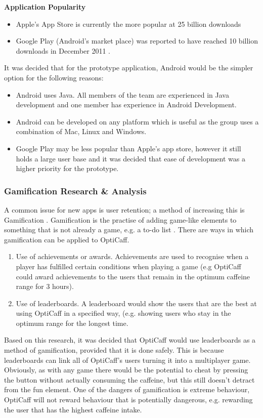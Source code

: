 \textbf{Application Popularity}
\begin{itemize}
	\item{Apple's App Store is currently the more popular at 25 billion downloads \cite{AppleDownload}}
	\item{Google Play (Android's market place) was reported to have reached 10 billion downloads in December 2011 \cite{AndroidDownload}.}
\end{itemize}

It was decided that for the prototype application, Android would be the simpler option for the following reasons:
\begin{itemize}
	\item{Android uses Java. All members of the team are experienced in Java development and one member has experience in Android Development.}
	\item{Android can be developed on any platform which is useful as the group uses a combination of Mac, Linux and Windows.}
	\item{Google Play may be less popular than Apple's app store, however it still holds a large user base and it was decided that ease of development was a higher priority for the prototype.}
\end{itemize}

\subsubsection{Gamification Research \& Analysis}
A common issue for new apps is user retention; a method of increasing this is Gamification \cite{gamification1}. Gamification is the practise of adding game-like elements to something that is not already a game, e.g. a to-do list \cite{gamification2}. There are ways in which gamification can be applied to OptiCaff.

\begin{enumerate}
	\item{Use of achievements or awards. Achievements are used to recognise when a player has fulfilled certain conditions when playing a game (e.g OptiCaff could award achievements to the users that remain in the optimum caffeine range for 3 hours).}
	\item{Use of leaderboards. A leaderboard would show the users that are the best at using OptiCaff in a specified way, (e.g. showing users who stay in the optimum range for the longest time.}
\end{enumerate}

Based on this research, it was decided that OptiCaff would use leaderboards as a method of gamification, provided that it is done safely. 
This is because leaderboards can link all of OptiCaff's users turning it into a multiplayer game. 
Obviously, as with any game there would be the potential to cheat by pressing the button without actually consuming the caffeine, but this still doesn't detract from the fun element. 
One of the dangers of gamification is extreme behaviour, OptiCaff will not reward behaviour that is potentially dangerous, e.g. rewarding the user that has the highest caffeine intake.


